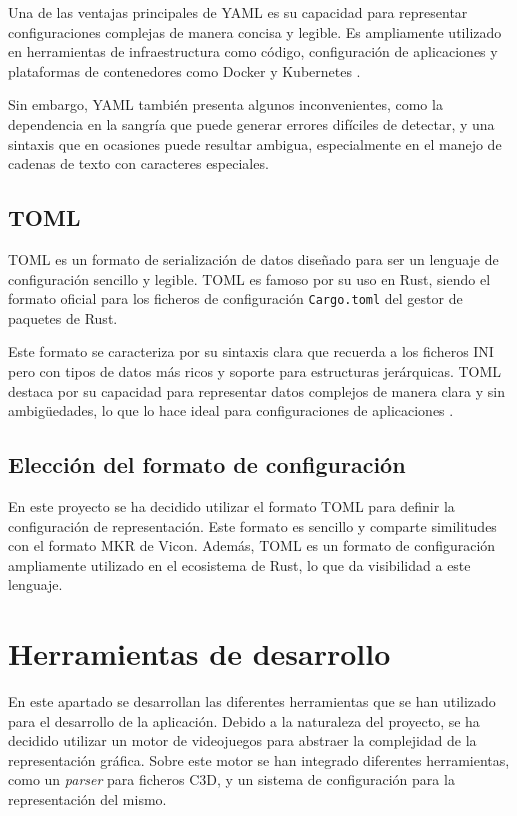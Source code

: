 Una de las ventajas principales de \ac{YAML} es su capacidad para representar configuraciones complejas de manera concisa y legible. Es ampliamente utilizado en herramientas de infraestructura como código, configuración de aplicaciones y plataformas de contenedores como Docker y Kubernetes \autocite{FicheroDockercomposeyml,february2024YAMLBasicsKubernetes}.

Sin embargo, \ac{YAML} también presenta algunos inconvenientes, como la dependencia en la sangría que puede generar errores difíciles de detectar, y una sintaxis que en ocasiones puede resultar ambigua, especialmente en el manejo de cadenas de texto con caracteres especiales.

\subsection{\acs{TOML}}

\ac{TOML} es un formato de serialización de datos diseñado para ser un lenguaje de configuración sencillo y legible. \ac{TOML} es famoso por su uso en Rust, siendo el formato oficial para los ficheros de configuración \texttt{Cargo.toml} del gestor de paquetes de Rust.

Este formato se caracteriza por su sintaxis clara que recuerda a los ficheros INI pero con tipos de datos más ricos y soporte para estructuras jerárquicas. \ac{TOML} destaca por su capacidad para representar datos complejos de manera clara y sin ambigüedades, lo que lo hace ideal para configuraciones de aplicaciones \autocite{TOMLEnglishV100}.

\subsection{Elección del formato de configuración}

En este proyecto se ha decidido utilizar el formato \ac{TOML} para definir la configuración de representación. Este formato es sencillo y comparte similitudes con el formato MKR de Vicon. Además, \ac{TOML} es un formato de configuración ampliamente utilizado en el ecosistema de Rust, lo que da visibilidad a este lenguaje.

\section{Herramientas de desarrollo}

En este apartado se desarrollan las diferentes herramientas que se han utilizado para el desarrollo de la aplicación. Debido a la naturaleza del proyecto, se ha decidido utilizar un motor de videojuegos para abstraer la complejidad de la representación gráfica. Sobre este motor se han integrado diferentes herramientas, como un \textit{parser} para ficheros \ac{C3D}, y un sistema de configuración para la representación del mismo.

